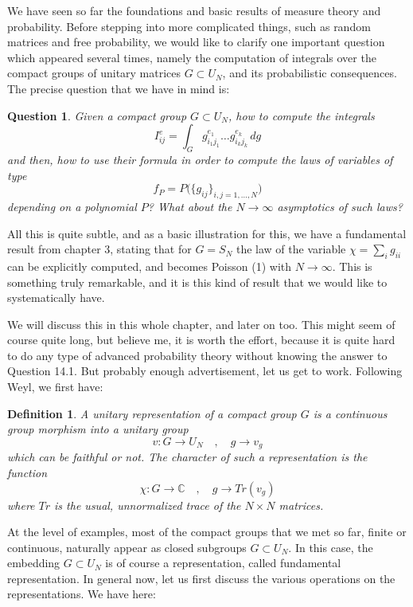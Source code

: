\documentclass[12pt]{amsbook}
\newtheorem{definition}[theorem]{Definition}
\newtheorem{question}[theorem]{Question}
\begin{document}
We have seen so far the foundations and basic results of measure theory and probability. Before stepping into more complicated things, such as random matrices and free probability, we would like to clarify one important question which appeared several times, namely the computation of integrals over the compact groups of unitary matrices $G\subset U_N$, and its probabilistic consequences. The precise question that we have in mind is:

\begin{question}
Given a compact group $G\subset U_N$, how to compute the integrals
$$I_{ij}^e=\int_Gg_{i_1j_1}^{e_1}\ldots g_{i_kj_k}^{e_k}\,dg$$
and then, how to use their formula in order to compute the laws of variables of type
$$f_P=P\Big(\{g_{ij}\}_{i,j=1,\ldots,N}\Big)$$
depending on a polynomial $P$? What about the $N\to\infty$ asymptotics of such laws?
\end{question}

All this is quite subtle, and as a basic illustration for this, we have a fundamental result from chapter 3, stating that for $G=S_N$ the law of the variable $\chi=\sum_ig_{ii}$ can be explicitly computed, and becomes Poisson (1) with $N\to\infty$. This is something truly remarkable, and it is this kind of result that we would like to systematically have.

\bigskip

We will discuss this in this whole chapter, and later on too. This might seem of course quite long, but believe me, it is worth the effort, because it is quite hard to do any type of advanced probability theory without knowing the answer to Question 14.1. But probably enough advertisement, let us get to work. Following Weyl, we first have:


\begin{definition}
A unitary representation of a compact group $G$ is a continuous group morphism into a unitary group
$$v:G\to U_N\quad,\quad g\to v_g$$
which can be faithful or not. The character of such a representation is the function
$$\chi:G\to\mathbb C\quad,\quad g\to Tr(v_g)$$
where $Tr$ is the usual, unnormalized trace of the $N\times N$ matrices.
\end{definition}

At the level of examples, most of the compact groups that we met so far, finite or continuous, naturally appear as closed subgroups $G\subset U_N$. In this case, the embedding $G\subset U_N$ is of course a representation, called fundamental representation. In general now, let us first discuss the various operations on the representations. We have here:
\end{document}
